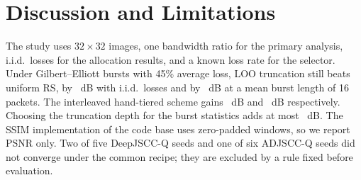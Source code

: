 \section{Discussion and Limitations}
The study uses $32{\times}32$ images, one bandwidth ratio for the primary analysis, i.i.d.\ losses for the
allocation results, and a known loss rate for the selector. Under Gilbert--Elliott bursts with 45\% average
loss, LOO truncation still beats uniform RS, by \BurstTruncGainOne~dB with i.i.d.\ losses and by
\BurstTruncGainSixteen~dB at a mean burst length of 16 packets. The interleaved hand-tiered scheme gains
\BurstHandGainOne~dB and \BurstHandGainSixteen~dB respectively. Choosing the truncation depth for the burst
statistics adds at most \BurstDepthGainMax~dB. The SSIM implementation of the code base uses zero-padded
windows, so we report PSNR only. Two of five DeepJSCC-Q seeds and one of six ADJSCC-Q seeds did not
converge under the common recipe; they are excluded by a rule fixed before evaluation.
